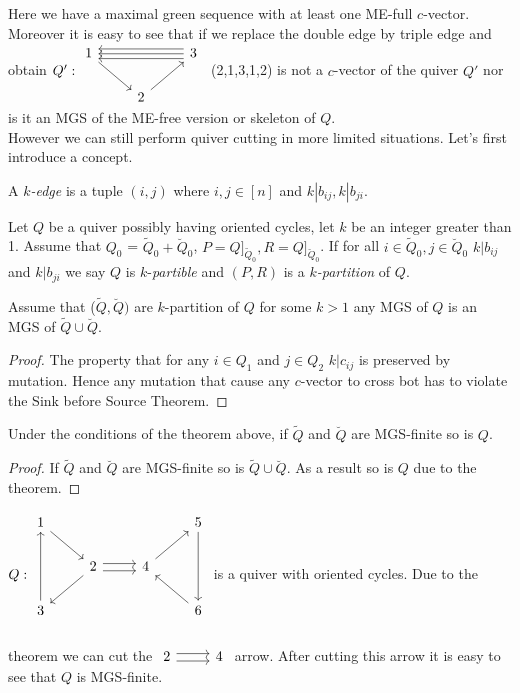 \indent Here we have a maximal green sequence with at least one ME-full $c$-vector. Moreover it is easy to see that if we replace the double edge by triple edge and obtain $Q': \begin{tikzcd}
1\arrow[rd] &  & 3\lefttwicetriplearrow\\
 & 2\arrow[ur]
\end{tikzcd}$\ (2,1,3,1,2) is not a $c$-vector of the quiver $Q'$ nor is it an MGS of the ME-free version or skeleton of $Q$.\\
\indent However we can still perform quiver cutting in more limited situations. Let's first introduce a concept.
\begin{definition}
A $k$\textit{-edge} is a tuple $(i,j)$ where $i,j\in [n]$ and $k|b_{ij}, k|b_{ji}$.
\end{definition}
\begin{definition}
Let $Q$ be a quiver possibly having oriented cycles, let $k$ be an integer greater than 1. Assume that $Q_0$ = $\tilde{Q}_0 + \breve{Q}_0$, $P = Q]_{\tilde{Q}_0}, R = Q]_{\breve{Q}_0}$. If for all $i\in \tilde{Q}_0, j\in  \breve{Q}_0$ $k|b_{ij}$ and $k|b_{ji}$ we say $Q$ is $k$-\textit{partible} and $(P, R)$ is a $k$\textit{-partition} of $Q$.
\end{definition}
\begin{theorem}
Assume that ($\tilde{Q},\breve{Q})$ are $k$-partition of $Q$ for some $k>1$ any MGS of $Q$ is an MGS of $\tilde{Q}\cup\breve{Q}$.\label{C4T2B}
\end{theorem}
\begin{proof}
The property that for any $i\in Q_1$ and $j\in Q_2$ $k|c_{ij}$ is preserved by mutation. Hence any mutation that cause any $c$-vector to cross bot has to violate the Sink before Source Theorem.
\end{proof}
\begin{corollary}
Under the conditions of the theorem above, if $\tilde{Q}$ and $\breve{Q}$ are MGS-finite so is $Q$.
\end{corollary}
\begin{proof}
If $\tilde{Q}$ and $\breve{Q}$ are MGS-finite so is $\tilde{Q}\cup\breve{Q}$. As a result so is $Q$ due to the theorem.
\end{proof}
\begin{example}
$Q:\begin{tikzcd}
1\arrow[rd] &                                             &                   &5\arrow[dd]\\
                 &2\arrow[dl]\rightdoublearrow & 4\arrow[ur] &\\
3\arrow[uu] &                                            &                  &6\arrow[ul]\\
\end{tikzcd}$ is a quiver with oriented cycles. Due to the theorem we can cut the $\begin{tikzcd}2\rightdoublearrow & 4\end{tikzcd}$ arrow. After cutting this arrow it is easy to see that $Q$ is MGS-finite.
\end{example}
